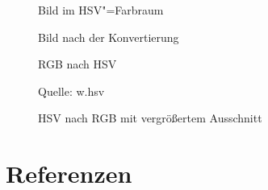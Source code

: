 \documentclass[a4paper,12pt,abstracton,titlepage]{scrartcl}
\begin{document}
 

\begin{figure}[htbp]
\begin{minipage}[t]{0.48\textwidth}
  \begin{center}
    \caption{Bild im HSV"=Farbraum}
    \label{hsvVorher}
  \end{center}
\end{minipage}
\begin{minipage}[t]{0.52\textwidth}
  \begin{center}
    \caption{Bild nach der Konvertierung}
    \label{hsv2rgb}
  \end{center}
\end{minipage}
\end{figure}


\newpage
\begin{figure}[htbp]
\begin{minipage}[t]{0.48\textwidth}
  \begin{center}
    \caption{RGB nach HSV}
    \label{errorBall}
    \begin{small}
    Quelle: w.hsv
    \end{small}
  \end{center}
\end{minipage}
\begin{minipage}[t]{0.48\textwidth}
  \begin{center}
    \caption{HSV nach RGB mit vergrößertem Ausschnitt}
    \label{errorBallRGB}
  \end{center}
\end{minipage}
\end{figure}



\section{Referenzen}
\nocite{*} 
\end{document}
